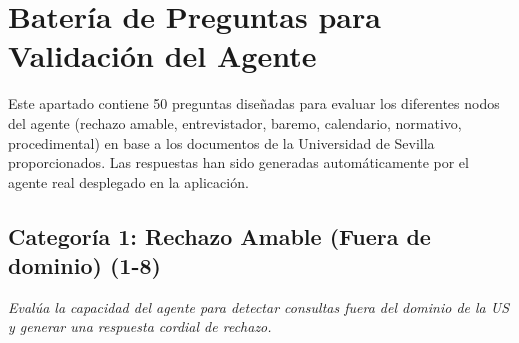 \documentclass{article}
\begin{document}
\newpage
\section{Batería de Preguntas para Validación del Agente}

Este apartado contiene 50 preguntas diseñadas para evaluar los diferentes nodos del agente (rechazo amable, entrevistador, baremo, calendario, normativo, procedimental) en base a los documentos de la Universidad de Sevilla proporcionados. Las respuestas han sido generadas automáticamente por el agente real desplegado en la aplicación.

\subsection{Categoría 1: Rechazo Amable (Fuera de dominio) (1-8)}
\textit{Evalúa la capacidad del agente para detectar consultas fuera del dominio de la US y generar una respuesta cordial de rechazo.}
\end{document}
